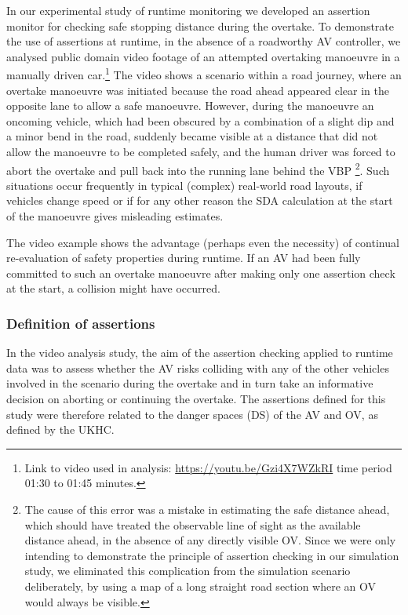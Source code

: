In our experimental study of runtime monitoring we developed an assertion monitor for checking safe stopping distance during the overtake. 
%
To demonstrate the use of assertions at runtime, in the absence of a roadworthy AV controller, we analysed public domain video footage of an attempted overtaking manoeuvre in a manually driven car.\footnote{Link to video used in analysis: \url{https://youtu.be/Gzi4X7WZkRI} time period 01:30 to 01:45 minutes.} The video shows a scenario within a road journey, where an overtake manoeuvre was initiated because the road ahead appeared clear in the opposite lane to allow a safe manoeuvre. However, during the manoeuvre an oncoming vehicle, which had been obscured by a combination of a slight dip and a minor bend in the road, suddenly became visible at a distance that did not allow the manoeuvre to be completed safely, and the human driver was forced to abort the overtake and pull back into the running lane behind the VBP \footnote{The cause of this error was a mistake in estimating the safe distance ahead, which should have treated the observable line of sight as the available distance ahead, in the absence of any directly visible OV. Since we were only intending to demonstrate the principle of assertion checking in our simulation study, we eliminated this complication from the simulation scenario deliberately, by using a map of a long straight road section where an OV would always be visible.}. Such situations occur frequently in typical (complex) real-world road layouts, if vehicles change speed or if for any other reason the SDA calculation at the start of the manoeuvre gives misleading estimates. 

The video example shows the advantage (perhaps even the necessity) of continual re-evaluation of safety properties during runtime. If an AV had been fully committed to such an overtake manoeuvre after making only one assertion check at the start, a collision might have occurred.
%


%


\subsubsection{Definition of assertions}
\label{DS_assessment}
In the video analysis study, the aim of the assertion checking applied to runtime data was to assess whether the AV risks colliding with any of the other vehicles involved in the scenario during the overtake and in turn take an informative decision on aborting or continuing the overtake. The assertions defined for this study were therefore related to the danger spaces (DS) of the AV and OV, as defined by the UKHC.

